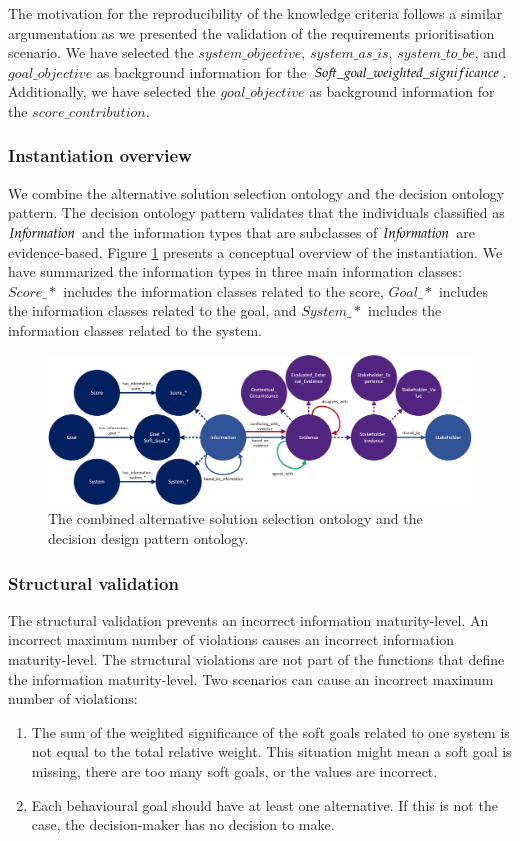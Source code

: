 The motivation for the reproducibility of the knowledge criteria follows a similar argumentation as we presented the validation of the requirements prioritisation scenario. We have selected the $system\_objective$, $system\_as\_is$, $system\_to\_be$, and $goal\_objective$ as background information for the $So{\mkern-2mu f\mkern-3mu}t\_goal\_weighted\_significance$. Additionally, we have selected the $goal\_objective$ as background information for the $score\_contribution$.

\subsubsection{Instantiation overview}
We combine the alternative solution selection ontology and the decision ontology pattern. The decision ontology pattern validates that the individuals classified as $In{\mkern-2mu f\mkern-3mu}ormation$ and the information types that are subclasses of $In{\mkern-2mu f\mkern-3mu}ormation$ are evidence-based. Figure \ref{fig:05_AS_Instantiated} presents a conceptual overview of the instantiation. We have summarized the information types in three main information classes: $Score\_*$ includes the information classes related to the score, $Goal\_*$ includes the information classes related to the goal, and $System\_*$ includes the information classes related to the system. 

\begin{figure}[H]
\centering
  \includegraphics[width=17cm]{../../Images/05_Validation/05_AS_Instantiated.png}
  \caption{The combined alternative solution selection ontology and the decision design pattern ontology.}
  \label{fig:05_AS_Instantiated}
\end{figure}

\subsubsection{Structural validation}
The structural validation prevents an incorrect information maturity-level. An incorrect maximum number of violations causes an incorrect information maturity-level. The structural violations are not part of the functions that define the information maturity-level. Two scenarios can cause an incorrect maximum number of violations:
\begin{enumerate}
\item The sum of the weighted significance of the soft goals related to one system is not equal to the total relative weight. This situation might mean a soft goal is missing, there are too many soft goals, or the values are incorrect.
\item Each behavioural goal should have at least one alternative. If this is not the case, the decision-maker has no decision to make.
\end{enumerate}


